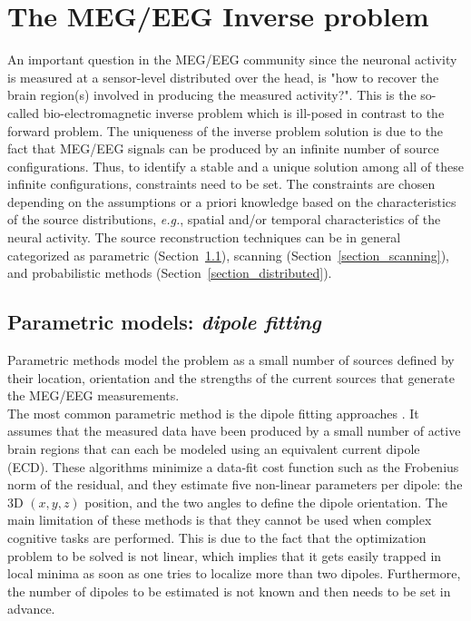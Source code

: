 
\section{The MEG/EEG Inverse problem}
An important question in the MEG/EEG community since the neuronal activity is measured at a sensor-level distributed over the head, is "how to recover the brain region(s) involved in producing the measured activity?". This is the so-called bio-electromagnetic inverse problem which is ill-posed in contrast to the forward problem. The uniqueness of the inverse problem solution is due to the fact that MEG/EEG signals can be produced by an infinite number of source configurations. Thus, to identify a stable and a unique solution among all of these infinite configurations, constraints need to be set. The constraints are chosen depending on the assumptions or a priori knowledge based on the characteristics of the source distributions, \textit{e.g.}, spatial and/or temporal characteristics of the neural activity. The source reconstruction techniques can be in general categorized as parametric (Section~\ref{section_dipfit}), scanning (Section~\ref{section_scanning}), and probabilistic methods (Section~\ref{section_distributed}).

\subsection{Parametric models: \textit{dipole fitting}} \label{section_dipfit}
Parametric methods model the problem as a small number of sources defined by their location, orientation and the strengths of the current sources that generate the MEG/EEG measurements.\\
The most common parametric method is the dipole fitting approaches \cite{scherg1985two,mosher1992multiple,scherg1990fundamentals}. It assumes that the measured data have been produced by a small number of active brain regions that can each be modeled using an equivalent current dipole (ECD). These algorithms minimize a data-fit cost function such as the Frobenius norm of the residual, and they estimate five non-linear parameters per dipole: the 3D $(x,y,z)$ position, and the two angles to define the dipole orientation. The main limitation of these methods is that they cannot be used when complex cognitive tasks are performed. This is due to the fact that the optimization problem to be solved is not linear, which implies that it gets easily trapped in local minima as soon as one tries to localize more than two dipoles. Furthermore, the number of dipoles to be estimated is not known and then needs to be set in advance. 

